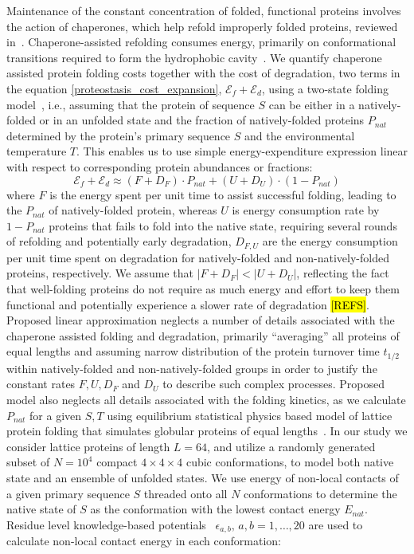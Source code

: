 \documentclass[10pt,letterpaper]{article}
\begin{document}
Maintenance of the constant concentration of folded, functional proteins involves the action of chaperones, which help refold improperly folded proteins, reviewed in~\cite{Hartl2011Molecular}. Chaperone-assisted refolding consumes energy, primarily on conformational transitions required to form the hydrophobic cavity~\cite{Hartl2011Molecular}. We quantify chaperone assisted protein folding costs together with the cost of degradation, two terms in the equation \eqref{proteostasis_cost_expansion}, $\mathcal{E}_{f} + \mathcal{E}_{d}$, using a two-state folding model~\cite{Mirny2001Protein,Dill1995Principles}, i.e., assuming that the protein of sequence $S$ can be either in a natively-folded or in an unfolded state and the fraction of natively-folded proteins $P_{nat}$ determined by the protein's primary sequence $S$ and the environmental temperature $T$. This enables us to use simple energy-expenditure expression linear with respect to corresponding protein abundances or fractions:
\begin{equation}
	\label{chaperone_degradation_cost}
	\mathcal{E}_{f} + \mathcal{E}_{d} \approx (F+D_{F})\cdot P_{nat} + (U+D_{U})\cdot\left(1-P_{nat}\right)
\end{equation}
where $F$ is the energy spent per unit time to assist successful folding, leading to the $P_{nat}$ of natively-folded protein, whereas $U$ is energy consumption rate by $1-P_{nat}$ proteins that fails to fold into the native state, requiring several rounds of refolding and potentially early degradation, $D_{F,U}$ are the energy consumption per unit time spent on degradation for natively-folded and non-natively-folded proteins, respectively. We assume that $|F+D_{F}|<|U+D_{U}|$, reflecting the fact that well-folding proteins do not require as much energy and effort to keep them functional and potentially experience a slower rate of degradation \hl{[REFS]}. Proposed linear approximation neglects a number of details associated with the chaperone assisted folding and degradation, primarily ``averaging'' all proteins of equal lengths and assuming narrow distribution of the protein turnover time $t_{1/2}$ within natively-folded and non-natively-folded groups in order to justify the constant rates $F,U,D_{F}$ and $D_{U}$ to describe such complex processes. Proposed model also neglects all details associated with the folding kinetics, as we calculate $P_{nat}$ for a given $S,T$ using equilibrium statistical physics based model of lattice protein folding that simulates globular proteins of equal lengths~\cite{Shakhnovich1990Enumeration}. In our study we consider lattice proteins of length $L=64$, and utilize a randomly generated subset of $N=10^{4}$ compact $4\times4\times4$ cubic conformations, to model both native state and an ensemble of unfolded states. We use energy of non-local contacts of a given primary sequence $S$ threaded onto all $N$ conformations to determine the native state of $S$ as the conformation with the lowest contact energy $E_{nat}$. Residue level knowledge-based potentials~\cite{Miyazawa1999SelfConsistent} $\epsilon_{a,b},\, a,b=1,\dots,20$ are used to calculate non-local contact energy in each conformation:
\end{document}
